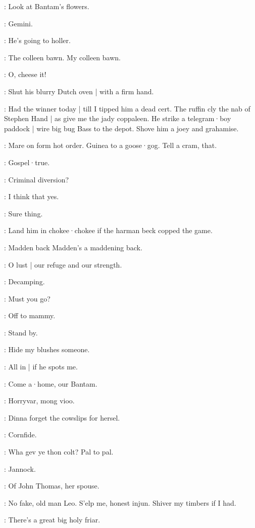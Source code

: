 \lenehan:
Look at Bantam's flowers.

\Bloom:
Gemini.

\stephen:
He's going to holler.

\bystander:
The colleen bawn.
My colleen bawn.

\madden:
O,
cheese it!

\punch:
Shut his blurry Dutch oven |
with a firm hand.

\lenehan:
Had the winner today |
till I tipped him a dead cert.
The ruffin cly the nab of Stephen Hand |
as give me the jady coppaleen.
He strike a telegram·boy paddock |
wire big bug Bass to the depot.
Shove him a joey and grahamise.

\lenehan:
Mare on form hot order.
Guinea to a goose·gog.
Tell a cram,
that.

\lenehan:
Gospel·true.

\punch:
Criminal diversion?

\stephen:
I think that yes.

\bannon:
Sure thing.

\mulligan:
Land him in chokee·chokee if the harman beck copped the game.

\dixon:
Madden back Madden's a maddening back.

\lynch:
O lust |
our refuge and our strength.

\madden:
Decamping.

\bannon:
Must you go?

\madden:
Off to mammy.

\dixon:
Stand by.

\madden:
Hide my blushes someone.


\Bloom:
All in |
if he spots me.

\punch:
Come a·home,
our Bantam.

\dixon:
Horryvar,
mong vioo.

\crotthers:
Dinna forget the cowslips for hersel.

\bannon:
Cornfide.

\crotthers:
Wha gev ye thon colt?
Pal to pal.

\lynch:
Jannock.

\bantam:
Of John Thomas,
her spouse.

\lenehan:
No fake,
old man Leo.
S'elp me,
honest injun.
Shiver my timbers if I had.

\mulligan:
There's a great big holy friar.

